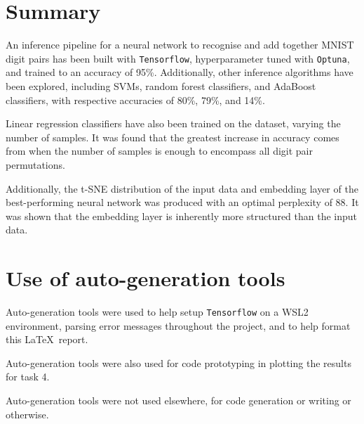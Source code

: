 \documentclass[11pt,a4paper]{article}
\begin{document}
\section{Summary}
An inference pipeline for a neural network to recognise and add together MNIST digit pairs has been built with \texttt{Tensorflow}, hyperparameter tuned with \texttt{Optuna}, and trained to an accuracy of 95\%. Additionally, other inference algorithms have been explored, including SVMs, random forest classifiers, and AdaBoost classifiers, with respective accuracies of 80\%, 79\%, and 14\%. 

Linear regression classifiers have also been trained on the dataset, varying the number of samples. It was found that the greatest increase in accuracy comes from when the number of samples is enough to encompass all digit pair permutations.

Additionally, the t-SNE distribution of the input data and embedding layer of the best-performing neural network was produced with an optimal perplexity of 88. It was shown that the embedding layer is inherently more structured than the input data.
\clearpage


\appendix
\section{Use of auto-generation tools}
Auto-generation tools were used to help setup \texttt{Tensorflow} on a WSL2 environment, parsing error messages throughout the project, and to help format this \LaTeX\ report.

Auto-generation tools were also used for code prototyping in plotting the results for task 4. 

Auto-generation tools were not used elsewhere, for code generation or writing or otherwise.
\end{document}
